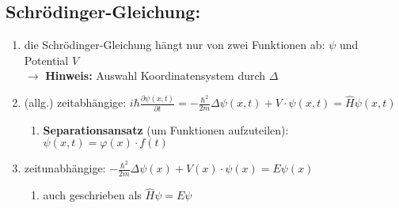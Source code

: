 \subsection{Schrödinger-Gleichung:}\label{schroedinger}
\begin{enumerate}
    \item die Schrödinger-Gleichung hängt nur von zwei Funktionen ab: $\psi$ und Potential $V$\\
    $\rightarrow$ \textbf{Hinweis:} Auswahl Koordinatensystem durch $\Delta$ 
    \item (allg.) zeitabhängige: $i\hbar\frac{\partial\psi\left(x,t\right)}{\partial t}=-\frac{\hbar^{2}}{2m} \Delta \psi\left(x,t\right)+V\cdot\psi\left(x,t\right)=\hat{H}\psi\left(x,t\right)$
    \begin{enumerate}
        \item \textbf{Separationsansatz} (um Funktionen aufzuteilen): $\psi(x,t)=\varphi(x)\cdot f(t)$
    \end{enumerate}


    \item zeitunabhängige: $-\frac{\hbar^{2}}{2m}\Delta\psi\left(x\right)+V(x)\cdot\psi\left(x\right)=E\psi\left(x\right)$ 
    \begin{enumerate}
        \item auch geschrieben als $\hat{H}\psi=E\psi$
    \end{enumerate}
\end{enumerate}
\newpage

